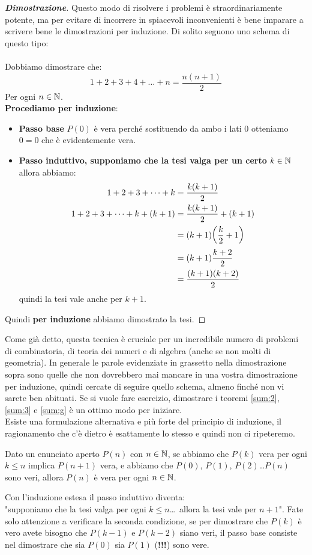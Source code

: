 \documentclass[11pt]{scrartcl}
\begin{document}
\begin{proof}[\textbf{Dimostrazione}]
		Questo modo di risolvere i problemi è straordinariamente potente, ma per evitare di incorrere in spiacevoli inconvenienti è bene imparare a scrivere bene le dimostrazioni per induzione. Di solito seguono uno schema di questo tipo:
		\\
		\\
		Dobbiamo dimostrare che:
		$$1+2+3+4+\dots+n=\frac{n(n+1)}{2}$$
		Per ogni $n\in\mathbb N$.\\
		\textbf{Procediamo per induzione}:
		\begin{itemize}
			\item \textbf{Passo base} $P(0)$ è vera perché sostituendo da ambo i lati $0$ otteniamo $0=0$ che è evidentemente vera.
			\item \textbf{Passo induttivo, supponiamo che la tesi valga per un certo $k\in\mathbb N$} allora abbiamo:
			\begin{equation}\notag
				\begin{split}
					1+2+3+\dots+k & = \frac{k(k+1)}{2} \\
					1+2+3+\dots+k+(k+1) & = \frac{k(k+1)}{2}+(k+1) \\
					& = (k+1)\bigg(\frac{k}{2}+1\bigg) \\
					& = (k+1)\frac{k+2}{2} \\
					& = \frac{(k+1)(k+2)}{2}
				\end{split}
			\end{equation}
			quindi la tesi vale anche per $k+1$.
		\end{itemize}
		Quindi \textbf{per induzione} abbiamo dimostrato la tesi.
	\end{proof}
	Come già detto, questa tecnica è cruciale per un incredibile numero di problemi di combinatoria, di teoria dei numeri e di algebra (anche se non molti di geometria). In generale le parole evidenziate in grassetto nella dimostrazione sopra sono quelle che non dovrebbero mai mancare in una vostra dimostrazione per induzione, quindi cercate di seguire quello schema, almeno finché non vi sarete ben abituati. Se si vuole fare esercizio, dimostrare i teoremi \ref{sum:2}, \ref{sum:3} e \ref{sum:g} è un ottimo modo per iniziare.
	\\
	Esiste una formulazione alternativa e più forte del principio di induzione, il ragionamento che c'è dietro è esattamente lo stesso e quindi non ci ripeteremo.
	\begin{proposition}
		Dato un enunciato aperto $P(n)$ con $n\in\mathbb N$, se abbiamo che $P(k)$ vera per ogni $k\le n$ implica $P(n+1)$ vera, e abbiamo che $P(0)$, $P(1)$, $P(2)$\dots $P(n)$ sono veri, allora $P(n)$ è vera per ogni $n\in\mathbb N$.
	\end{proposition}
	Con l'induzione estesa il passo induttivo diventa:\\
	"supponiamo che la tesi valga per ogni $k\le n$\dots \, allora la tesi vale per $n+1$". Fate solo attenzione a verificare la seconda condizione, se per dimostrare che $P(k)$ è vero avete bisogno che $P(k-1)$ e $P(k-2)$ siano veri, il passo base consiste nel dimostrare che sia $P(0)$ sia $P(1)$ (\textbf{!!!}) sono vere.
	
\end{document}
